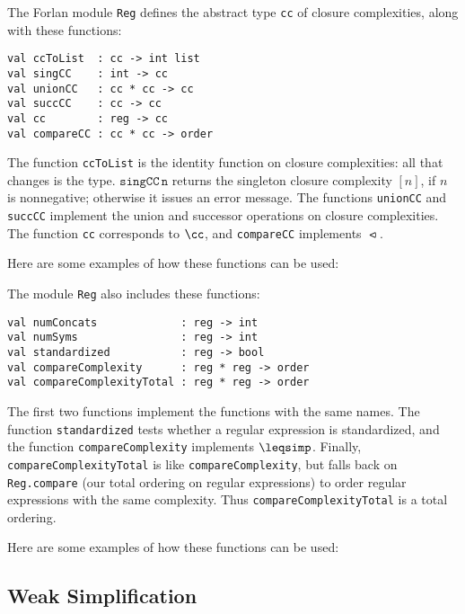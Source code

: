 The Forlan module \texttt{Reg} defines the abstract type \texttt{cc}
of closure complexities, along with these functions:
\begin{verbatim}
val ccToList  : cc -> int list
val singCC    : int -> cc
val unionCC   : cc * cc -> cc
val succCC    : cc -> cc
val cc        : reg -> cc
val compareCC : cc * cc -> order
\end{verbatim}
The function \texttt{ccToList} is the identity function on closure
complexities: all that changes is the type.  $\mathtt{singCC\,n}$
returns the singleton closure complexity $[n]$, if $n$ is nonnegative;
otherwise it issues an error message.  The functions \texttt{unionCC}
and \texttt{succCC} implement the union and successor operations on
closure complexities.  The function \texttt{cc} corresponds to $\cc$, and
\texttt{compareCC} implements $\ltcc$.

Here are some examples of how these functions can be used:


The module \texttt{Reg} also includes these functions:
\begin{verbatim}
val numConcats             : reg -> int
val numSyms                : reg -> int
val standardized           : reg -> bool
val compareComplexity      : reg * reg -> order
val compareComplexityTotal : reg * reg -> order
\end{verbatim}
The first two functions implement the functions with the same names.
The function \texttt{standardized} tests whether a regular expression
is standardized, and the function \texttt{compareComplexity} implements
$\leqsimp$.  Finally, \texttt{compareComplexityTotal} is like
\texttt{compareComplexity}, but falls back on \texttt{Reg.compare}
(our total ordering on regular expressions) to order regular expressions
with the same complexity.  Thus \texttt{compareComplexityTotal} is
a total ordering.

Here are some examples of how these functions can be used:


\subsection{Weak Simplification}

